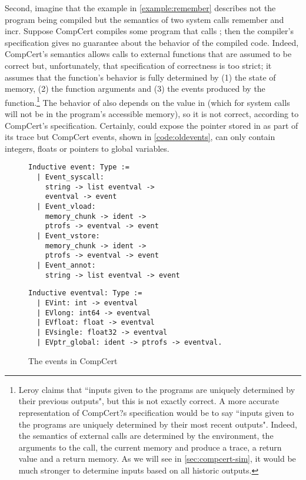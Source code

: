 Second, imagine that the example in \autoref{example:remember} describes not the program being compiled but the semantics of two system calls \textsf{remember} and \textsf{incr}.  Suppose CompCert compiles some program that calls ; then the compiler's specification gives no guarantee about the behavior of the compiled code. Indeed, CompCert's semantics allows calls to external functions that are assumed to be correct but, unfortunately, that specification of correctness is too strict; it  assumes that the function's behavior is fully determined by (1) the state of memory, (2) the function arguments and (3) the events produced by the function.\footnote{Leroy \cite{Leroy-Compcert-CACM} claims that ``inputs given to the programs are uniquely determined by their previous outputs", but this is not exactly correct. A more accurate representation of CompCert?s specification would be to say ``inputs given to the programs are uniquely determined by their most recent outputs". Indeed, the semantics of external calls  are determined by the environment, the arguments to the call, the current memory and produce a trace, a return value and a return memory. As we will see in \autoref{sec:compcert-sim}, it would be much stronger to determine inputs based on all historic outputs.} The behavior of  also depends on the value in  (which for system calls will not be in the program's accessible memory), so it is not correct, according to CompCert's specification. Certainly,  could expose the pointer stored in  as part of its trace but CompCert events, shown in \autoref{code:oldevents}, can only contain integers, floats or pointers to global variables.
 
\begin{figure}\centering
\begin{multicols}{2}
\begin{lstlisting}[style=CoqTheorem-list]
Inductive event: Type :=
  | Event_syscall: 
  	string -> list eventval -> 
  	eventval -> event
  | Event_vload: 
  	memory_chunk -> ident -> 
  	ptrofs -> eventval -> event
  | Event_vstore: 
  	memory_chunk -> ident -> 
  	ptrofs -> eventval -> event
  | Event_annot: 
  	string -> list eventval -> event
  \end{lstlisting}
  \columnbreak
  \begin{lstlisting}
Inductive eventval: Type :=
  | EVint: int -> eventval
  | EVlong: int64 -> eventval
  | EVfloat: float -> eventval
  | EVsingle: float32 -> eventval
  | EVptr_global: ident -> ptrofs -> eventval.
  \end{lstlisting}
\end{multicols}
\caption[Events in CompCert]{The events in CompCert}\label{code:oldevents}
\end{figure}

